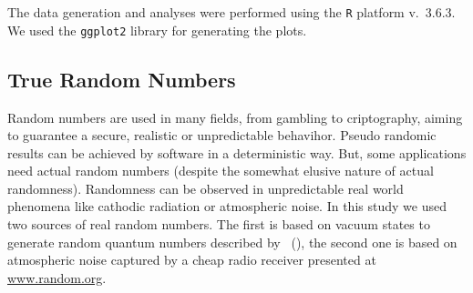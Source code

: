 The data generation and analyses were performed using the \texttt R platform \cite{Rmanual} v.~3.6.3.
We used the \texttt{ggplot2} library \cite{ggplot2Wickman} for generating the plots.

\subsection{True Random Numbers}


Random numbers are used in many fields, from gambling to criptography, aiming to guarantee a secure, realistic or unpredictable behavihor. 
Pseudo randomic results can be achieved by software in a deterministic way. 
But, some applications need actual random numbers (despite the somewhat elusive nature of actual randomness).
Randomness can be observed in unpredictable real world phenomena like cathodic radiation or atmospheric noise.
In this study we used two sources of real random numbers. 
The first is based on vacuum states to generate random quantum numbers described by \citeauthor{RNGVacuumStates}~(\citeyear{RNGVacuumStates}), the second one is based on atmospheric noise captured by a cheap radio receiver presented at \url{www.random.org}.


